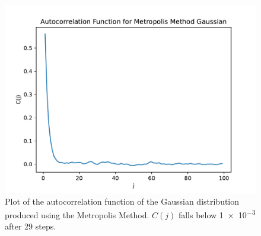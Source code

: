 \documentclass[11pt]{article}
\begin{document}
\begin{enumerate}
\begin{enumerate}
\begin{enumerate}
            \begin{figure}[h]
                \begin{center}
                    \includegraphics[width=.6\textwidth]{Plots/q4c.pdf}
                    \caption{Plot of the autocorrelation function of the Gaussian distribution produced using the Metropolis Method. $C(j)$ falls below \num{1e-3} after 29 steps.}
                    \label{fig:q4c}
                \end{center}
            \end{figure}
        \end{enumerate}
    \end{enumerate}
\end{enumerate}

\end{document}
